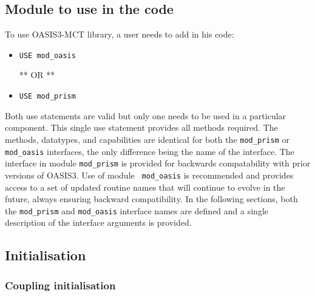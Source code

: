 \subsection{Module to use in the code}
\label{subsubsec_Use}

To use OASIS3-MCT library, a user needs to add in his code:

\begin{itemize}

\item {\tt USE mod\_oasis}

  ** OR **

\item {\tt USE mod\_prism}
 
\end{itemize}

Both use statements are valid but only one needs to be used in a particular component. This single use statement provides all methods required. The methods, datatypes, and capabilities
are identical for both the {\tt mod\_prism} or {\tt mod\_oasis}
interfaces, the only difference being the name of the interface. The
interface in module {\tt mod\_prism} is provided for backwards
compatability with prior versions of OASIS3. Use of module {\tt
  mod\_oasis} is recommended and provides access to a set of updated
routine names that will continue to evolve in the future, always
ensuring backward compatibility.  In the following sections, both the
{\tt mod\_prism} and {\tt mod\_oasis} interface names are defined and
a single description of the interface arguments is provided.

\subsection{Initialisation}
\label{subsubsec_Initialisation}

\subsubsection{Coupling initialisation}
\label{init_comp}

